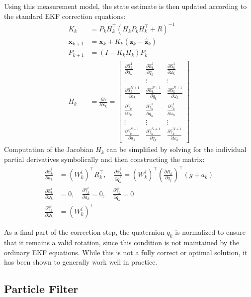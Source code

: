 \documentclass[letterpaper, 10 pt, conference]{ieeeconf}  %
\newcommand{\pd}[2]{\frac{\partial #1}{\partial #2}} %
\begin{document}
Using this measurement model, the state estimate is then updated according to the standard EKF correction equations:
\begin{align}
    K_k &= P_k H_k^\top (H_k P_k H_k^\top + R)^{-1} \\
    \mathbf{x}_{k+1} &= \mathbf{x}_k + K_k(\mathbf{z}_k - \hat{\mathbf{z}}_k) \\
    P_{k+1} &= (I - K_k H_k) P_k \\
    H_k &= \pd{h}{\mathbf{x}_k} = \begin{bmatrix}
        \pd{\hat{\alpha}_k^1}{a_k} & \pd{\hat{\alpha}_k^1}{q_k} & \pd{\hat{\alpha}_k^1}{\omega_k} \\
        \vdots & \vdots & \vdots \\
        \pd{\hat{\alpha}_k^{N+1}}{a_k} & \pd{\hat{\alpha}_k^{N+1}}{q_k} & \pd{\hat{\alpha}_k^{N+1}}{\omega_k} \\
        \pd{\hat{\gamma}_k^1}{a_k} & \pd{\hat{\gamma}_k^1}{q_k} & \pd{\hat{\gamma}_k^1}{\omega_k} \\
        \vdots & \vdots & \vdots \\
        \pd{\hat{\gamma}_k^{N+1}}{a_k} & \pd{\hat{\gamma}_k^{N+1}}{q_k} & \pd{\hat{\gamma}_k^{N+1}}{\omega_k}
    \end{bmatrix}
\end{align}
Computation of the Jacobian $H_k$ can be simplified by solving for the individual partial derivatives symbolically and then constructing the matrix:
\begin{align}
    \pd{\hat{\alpha}_k^i}{a_k} &= (W_k^i)^\top R_k^\top, \quad
    \pd{\hat{\alpha}_k^i}{q_k^j} = (W_k^i)^\top \left(\pd{R_k}{q_j}\right)^\top (g + a_k) \\
    \pd{\hat{\alpha}_k^i}{\omega_k} &= 0, \quad
    \pd{\hat{\gamma}_k^i}{a_k} = 0, \quad
    \pd{\hat{\gamma}_k^i}{q_k} = 0 \\
    \pd{\hat{\gamma}_k^i}{\omega_k} &= (W_k^i)^\top
\end{align}

As a final part of the correction step, the quaternion $q_k$ is normalized to ensure that it remains a valid rotation, since this condition is not maintained by the ordinary EKF equations. While this is not a fully correct or optimal solution, it has been shown to generally work well in practice.

\subsection{Particle Filter}
\end{document}
